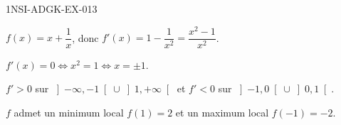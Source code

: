 \begin{corrige}{1NSI-ADGK-EX-013}

$f(x) = x + \dfrac{1}{x}$, donc $f'(x) = 1 - \dfrac{1}{x^2} = \dfrac{x^2-1}{x^2}$.


$f'(x) = 0 \iff x^2 = 1 \iff x = \pm 1$.

$f' > 0$ sur $\left]-\infty, -1\right[ \cup \left]1, +\infty\right[$ et $f' < 0$ sur $\left]-1, 0\right[ \cup \left]0, 1\right[$.

$f$ admet un minimum local $f(1) = 2$ et un maximum local $f(-1) = -2$.

\end{corrige}
